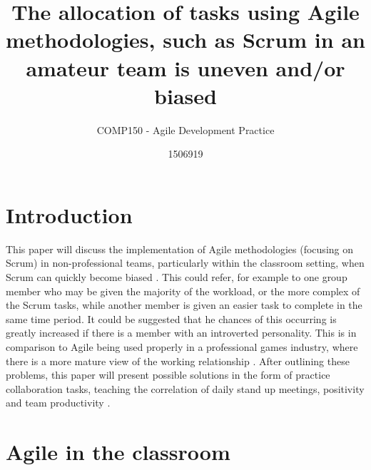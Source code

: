\documentclass{scrartcl}
\title{The allocation of tasks using Agile methodologies, such as Scrum in an amateur team is uneven and/or biased}
\subtitle{COMP150 - Agile Development Practice}
\author{1506919}
\begin{document}
\maketitle


\section{Introduction}

This paper will discuss the implementation of Agile methodologies \cite{beck2001manifesto} (focusing on Scrum) in non-professional teams, particularly within the classroom setting, when Scrum can quickly become biased \cite{kropp2014teaching}. This could refer, for example to one group member who may be given the majority of the workload, or the more complex of the Scrum tasks, while another member is given an easier task to complete in the same time period. It could be suggested that he chances of this occurring is greatly increased if there is a member with an introverted personality. This is in comparison to Agile being used properly in a professional games industry, where there is a more mature view of the working relationship \cite{kropp2016teaching}. After outlining these problems, this paper will present possible solutions in the form of practice collaboration tasks, teaching the correlation of daily stand up meetings, positivity and team productivity \cite{kropp2016teaching}.

\section{Agile in the classroom}
\end{document}
